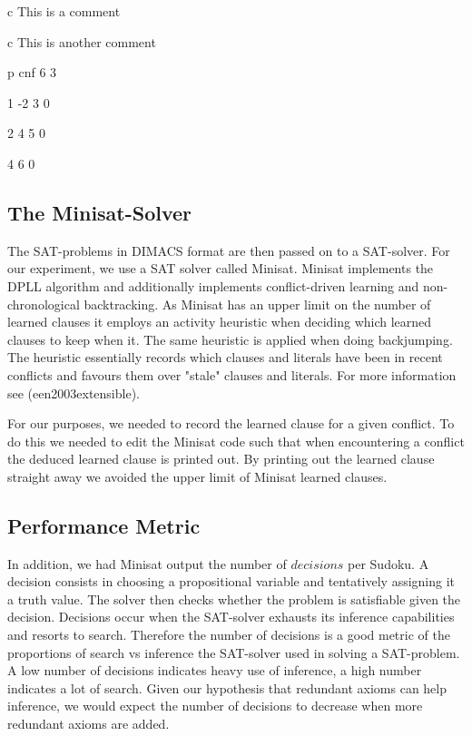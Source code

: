 \documentclass{article}
\begin{document}
c This is a comment

c This is another comment

p cnf 6 3

1 -2 3 0

2 4 5 0

4 6 0



\subsection{The Minisat-Solver}
The SAT-problems in DIMACS format are then passed on to a SAT-solver. For our experiment, we use a SAT solver called Minisat. Minisat implements the DPLL algorithm and additionally implements conflict-driven learning and non-chronological backtracking. As Minisat has an upper limit on the number of learned clauses it employs an activity heuristic when deciding which learned clauses to keep when it. The same heuristic is applied when doing backjumping. The heuristic essentially records which clauses and literals have been in recent conflicts and favours them over "stale" clauses and literals. For more information see (een2003extensible).

For our purposes, we needed to record the learned clause for a given conflict. To do this we needed to edit the Minisat code such that when encountering a conflict the deduced learned clause is printed out. By printing out the learned clause straight away we avoided the upper limit of Minisat learned clauses.

\subsection{Performance Metric}

In addition, we had Minisat output the number of $decisions$ per Sudoku. A decision consists in choosing a propositional variable and tentatively assigning it a truth value. The solver then checks whether the problem is satisfiable given the decision. Decisions occur when the SAT-solver exhausts its inference capabilities and resorts to search. Therefore the number of decisions is a good metric of the proportions of search vs inference the SAT-solver used in solving a SAT-problem. A low number of decisions indicates heavy use of inference, a high number indicates a lot of search.
Given our hypothesis that redundant axioms can help inference, we would expect the number of decisions to decrease when more redundant axioms are added.
\end{document}
